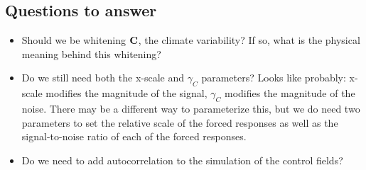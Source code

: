 \documentclass[11pt]{article}
\newcommand{\C}{\ensuremath{\text{Cov}}}
\def\C{\textbf{\text{C}}}
\begin{document}
\subsection{Questions to answer}
\begin{itemize}
\item Should we be whitening $\C$, the climate variability? If so, what is the physical meaning behind this whitening?
\item Do we still need both the x-scale and $\gamma_C$ parameters? Looks like probably: x-scale modifies the magnitude of the signal, $\gamma_C$ modifies the magnitude of the noise. There may be a different way to parameterize this, but we do need two parameters to set the relative scale of the forced responses as well as the signal-to-noise ratio of each of the forced responses.
\item Do we need to add autocorrelation to the simulation of the control fields?
\end{itemize}
\end{document}
